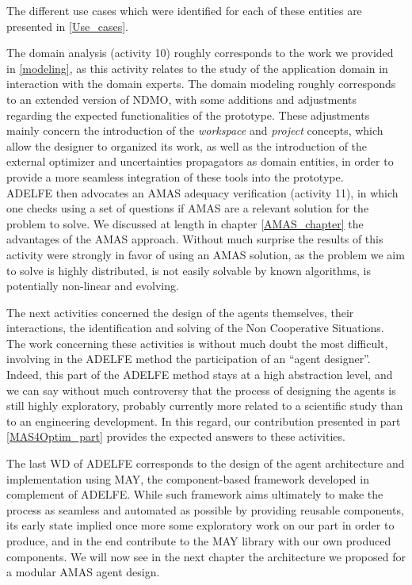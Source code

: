 The different use cases which were identified for each of these entities are presented in \figurename{} \ref{Use_cases}.

The domain analysis (activity 10) roughly corresponds to the work we provided in \ref{modeling}, as this activity relates to the study of the application domain in interaction with the domain experts. The domain modeling roughly corresponds to an extended version of NDMO, with some additions and adjustments regarding the expected functionalities of the prototype. These adjustments mainly concern the introduction of the \emph{workspace} and \emph{project} concepts, which allow the designer to organized its work, as well as the introduction of the external optimizer and uncertainties propagators as domain entities, in order to provide a more seamless integration of these tools into the prototype.\\
ADELFE then advocates an AMAS adequacy verification (activity 11), in which one checks using a set of questions if AMAS are a relevant solution for the problem to solve. We discussed at length in chapter \ref{AMAS_chapter} the advantages of the AMAS approach. Without much surprise the results of this activity were strongly in favor of using an AMAS solution, as the problem we aim to solve is highly distributed, is not easily solvable by known algorithms, is potentially non-linear and evolving.

The next activities concerned the design of the agents themselves, their interactions, the identification and solving of the Non Cooperative Situations. The work concerning these activities is without much doubt the most difficult, involving in the ADELFE method the participation of an \enquote{agent designer}. Indeed, this part of the ADELFE method stays at a high abstraction level, and we can say without much controversy that the process of designing the agents is still highly exploratory, probably currently more related to a scientific study than to an engineering development. In this regard, our contribution presented in part \ref{MAS4Optim_part} provides the expected answers to these activities.

The last WD of ADELFE corresponds to the design of the agent architecture and implementation using MAY, the component-based framework developed in complement of ADELFE. While such framework aims ultimately to make the process as seamless and automated as possible by providing reusable components, its early state implied once more some exploratory work on our part in order to produce, and in the end contribute to the MAY library with our own produced components. We will now see in the next chapter the architecture we proposed for a modular AMAS agent design.

